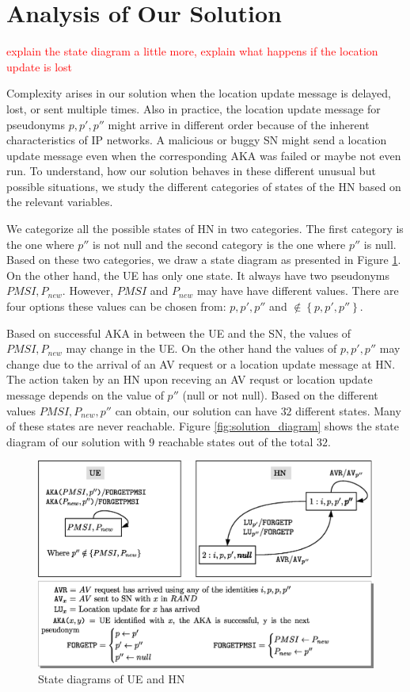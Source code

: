 \documentclass{llncs} %
\begin{document}
\section{Analysis of Our Solution}

\textcolor{red}{explain the state diagram a little more, explain what happens if the location update is lost}

Complexity arises in our solution when the location update message is delayed, lost, or sent multiple times. Also in practice, the location update message for pseudonyms $p,p',p''$ might arrive in different order because of the inherent characteristics of IP networks. A malicious or buggy SN might send a location update message even when the corresponding AKA was failed or maybe not even run.
To understand, how our solution behaves in these different unusual but possible situations, we study the different categories of states of the HN based on the relevant variables.  

We categorize all the possible states of HN in two categories. The first category is the one where $p''$ is not null and the second category is the one where $p''$ is null. Based on these two categories, we draw a state diagram as presented in Figure \ref{fig:HN_UE_diagrams}. On the other hand, the UE has only one state. It always have two pseudonyms $PMSI, P_{new}$. However, $PMSI$ and $P_{new}$ may have have different values. There are four options these values can be chosen from: $p,p',p''$ and $ \notin \left\lbrace p,p',p''\right\rbrace$. 

Based on successful AKA in between the UE and the SN, the values of $PMSI, P_{new}$ may change in the UE. On the other hand the values of $p,p',p''$ may change due to the arrival of an AV request or a location update message at HN. The action taken by an HN upon receving an AV requst or location update message depends on the value of $p''$ (null or not null). Based on the different values $PMSI,P_{new},p''$ can obtain, our solution can have $32$ different states. Many of these states are never reachable. Figure \ref{fig:solution_diagram} shows the state diagram of our solution with $9$ reachable states out of the total $32$. 



\begin{figure}
\centering
\includegraphics[width=.9\textwidth]{HN_UE_diagrams.eps}
\caption{State diagrams of UE and HN}
\label{fig:HN_UE_diagrams}
\end{figure}
\end{document}
